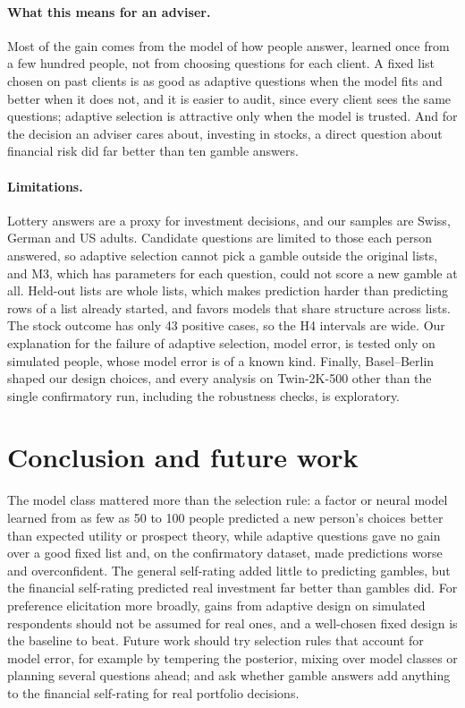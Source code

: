 \documentclass{article}
\begin{document}
\paragraph{What this means for an adviser.} Most of the gain comes from the model of how people answer, learned once from a few hundred people, not from choosing questions for each client. A fixed list chosen on past clients is as good as adaptive questions when the model fits and better when it does not, and it is easier to audit, since every client sees the same questions; adaptive selection is attractive only when the model is trusted. And for the decision an adviser cares about, investing in stocks, a direct question about financial risk did far better than ten gamble answers.

\paragraph{Limitations.} Lottery answers are a proxy for investment decisions, and our samples are Swiss, German and US adults. Candidate questions are limited to those each person answered, so adaptive selection cannot pick a gamble outside the original lists, and M3, which has parameters for each question, could not score a new gamble at all. Held-out lists are whole lists, which makes prediction harder than predicting rows of a list already started, and favors models that share structure across lists. The stock outcome has only 43 positive cases, so the H4 intervals are wide. Our explanation for the failure of adaptive selection, model error, is tested only on simulated people, whose model error is of a known kind. Finally, Basel--Berlin shaped our design choices, and every analysis on Twin-2K-500 other than the single confirmatory run, including the robustness checks, is exploratory.

\section{Conclusion and future work}

The model class mattered more than the selection rule: a factor or neural model learned from as few as 50 to 100 people predicted a new person's choices better than expected utility or prospect theory, while adaptive questions gave no gain over a good fixed list and, on the confirmatory dataset, made predictions worse and overconfident. The general self-rating added little to predicting gambles, but the financial self-rating predicted real investment far better than gambles did. For preference elicitation more broadly, gains from adaptive design on simulated respondents should not be assumed for real ones, and a well-chosen fixed design is the baseline to beat. Future work should try selection rules that account for model error, for example by tempering the posterior, mixing over model classes or planning several questions ahead; and ask whether gamble answers add anything to the financial self-rating for real portfolio decisions.
\end{document}
